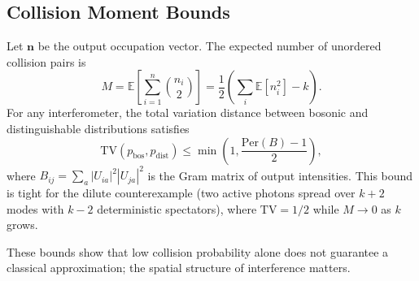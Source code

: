 \subsection{Collision Moment Bounds}

Let $\mathbf{n}$ be the output occupation vector. The expected number of unordered collision pairs is
\begin{equation}
M = \mathbb{E}\left[ \sum_{i=1}^n \binom{n_i}{2} \right] = \frac{1}{2} \left( \sum_i \mathbb{E}[n_i^2] - k \right).
\end{equation}
For any interferometer, the total variation distance between bosonic and distinguishable distributions satisfies
\begin{equation}
\mathrm{TV}(p_{\mathrm{bos}}, p_{\mathrm{dist}}) \le \min\left(1, \frac{\mathrm{Per}(B)-1}{2}\right),
\end{equation}
where $B_{ij} = \sum_a |U_{ia}|^2 |U_{ja}|^2$ is the Gram matrix of output intensities. This bound is tight for the dilute counterexample (two active photons spread over $k+2$ modes with $k-2$ deterministic spectators), where $\mathrm{TV} = 1/2$ while $M \to 0$ as $k$ grows.

These bounds show that low collision probability alone does not guarantee a classical approximation; the spatial structure of interference matters.
